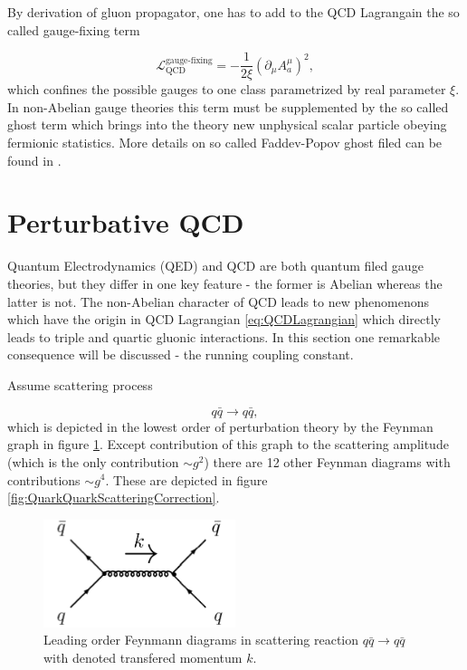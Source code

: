 \documentclass[a4paper,11pt]{report}
\begin{document}
By derivation of gluon propagator, one has to add to the QCD Lagrangain the so
called gauge-fixing term

\begin{equation}
  \mathscr{L}_{\text{QCD}}^{\text{gauge-fixing}} = - \frac{1}{2\xi} \left( \partial_\mu A_a^\mu
  \right)^2,
  \label{eq:QCDGaugeFixingTerm}
\end{equation}
which confines the possible gauges to one class parametrized by real parameter
$\xi$. In non-Abelian gauge theories this term must be supplemented by the so
called ghost term which brings into the theory new unphysical scalar particle
obeying fermionic statistics. More details on so called Faddev-Popov ghost filed
can be found in \cite{FaddeevPopovGhosts}.


\section{Perturbative QCD}

Quantum Electrodynamics (QED) and QCD are both quantum filed gauge theories, but
they differ in one key feature - the former is Abelian whereas the latter is
not. The non-Abelian character of QCD leads to new phenomenons which have the origin in QCD
Lagrangian \eqref{eq:QCDLagrangian} which directly leads to triple and quartic
gluonic interactions. In this section one remarkable consequence will be
discussed - the running coupling constant.

Assume scattering process  

\begin{equation}
  q \bar{q} \rightarrow q \bar{q},
  \label{eq:QuarkScattering}
\end{equation}
which is depicted in the lowest order of perturbation theory by the Feynman
graph in figure \ref{fig:QuarkQuarkScattering}. Except contribution of this
graph to the scattering amplitude (which is the only contribution $\sim g^2$)
there are 12 other Feynman diagrams with contributions $\sim g^4$. These are
depicted in figure \ref{fig:QuarkQuarkScatteringCorrection}. 

\begin{figure}[t]
  \centering
  \includegraphics[width=0.5\textwidth]{Chapter1/QuarkQuarkScattering.png} 
  \caption{Leading order Feynmann diagrams in scattering reaction $q \bar{q}
    \rightarrow q \bar{q}$ with denoted transfered momentum $k$.}
  \label{fig:QuarkQuarkScattering}
\end{figure}
\end{document}
